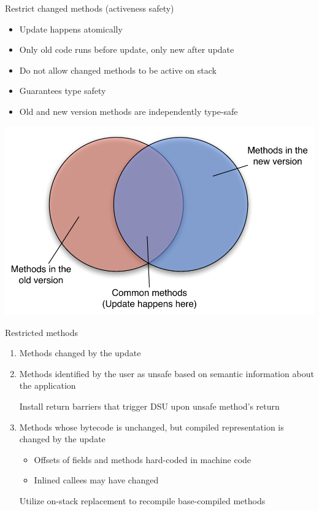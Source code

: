 \begin{frame}{Restrict changed methods (activeness safety)}%
\begin{itemize}
\item Update happens atomically
\item Only old code runs before update, only new after update
\item Do not allow changed methods to be active on stack
\item Guarantees type safety
\item Old and new version methods are independently type-safe
\end{itemize}
\begin{center}
\includegraphics[scale=0.38]{images/activeness-venn-diagram}
\end{center}
\end{frame}

\begin{frame}[t,fragile]{Restricted methods}%
\begin{enumerate}[(1)]
\item Methods changed by the update
\item Methods identified by the user as unsafe based on semantic
information about the application
\begin{block}{}
Install return barriers that trigger DSU upon unsafe method's return
\end{block}
\vspace{2ex}
\item<2> Methods whose bytecode is unchanged, but compiled representation is
      changed by the update
  \begin{itemize}
  \item Offsets of fields and methods hard-coded in machine code
  \item Inlined callees may have changed
  \end{itemize}
\begin{block}{}
Utilize on-stack replacement to recompile base-compiled methods
\end{block}
\end{enumerate}
\end{frame}

